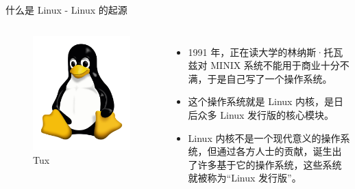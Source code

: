 \documentclass[UTF8]{ctexbeamer}
\begin{document}
\begin{frame}{什么是 Linux - Linux 的起源}
    \begin{columns}
    \begin{figure}
        \centering
        \includegraphics[width=\textwidth]{Tux.png}
        \caption{Tux}
        \label{fig:linux}
    \end{figure}
    \begin{itemize}

        \item 1991 年，正在读大学的林纳斯·托瓦兹对 MINIX 系统不能用于商业十分不满，于是自己写了一个操作系统。
        \item 这个操作系统就是 Linux 内核，是日后众多 Linux 发行版的核心模块。
        \item Linux 内核不是一个现代意义的操作系统，但通过各方人士的贡献，诞生出了许多基于它的操作系统，这些系统就被称为“Linux 发行版”。
    \end{itemize}

    \end{columns}
    
\end{frame}
\end{document}
